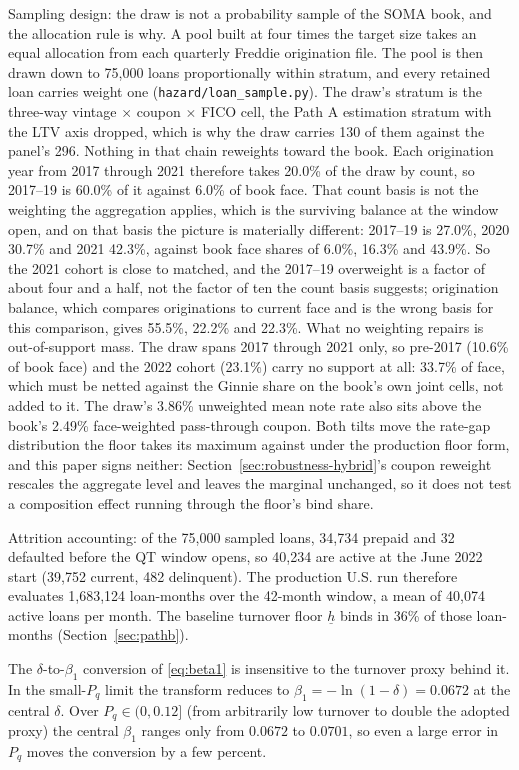 \documentclass[12pt]{article}
\begin{document}
Sampling design: the draw is not a probability sample of the SOMA book, and the allocation rule is why. A pool built at four times the target size takes an equal allocation from each quarterly Freddie origination file. The pool is then drawn down to 75,000 loans proportionally within stratum, and every retained loan carries weight one (\texttt{hazard/loan\_sample.py}). The draw's stratum is the three-way vintage $\times$ coupon $\times$ FICO cell, the Path A estimation stratum with the LTV axis dropped, which is why the draw carries 130 of them against the panel's 296. Nothing in that chain reweights toward the book. Each origination year from 2017 through 2021 therefore takes 20.0\% of the draw by count, so 2017--19 is 60.0\% of it against 6.0\% of book face. That count basis is not the weighting the aggregation applies, which is the surviving balance at the window open, and on that basis the picture is materially different: 2017--19 is 27.0\%, 2020 30.7\% and 2021 42.3\%, against book face shares of 6.0\%, 16.3\% and 43.9\%. So the 2021 cohort is close to matched, and the 2017--19 overweight is a factor of about four and a half, not the factor of ten the count basis suggests; origination balance, which compares originations to current face and is the wrong basis for this comparison, gives 55.5\%, 22.2\% and 22.3\%. What no weighting repairs is out-of-support mass. The draw spans 2017 through 2021 only, so pre-2017 (10.6\% of book face) and the 2022 cohort (23.1\%) carry no support at all: 33.7\% of face, which must be netted against the Ginnie share on the book's own joint cells, not added to it. The draw's 3.86\% unweighted mean note rate also sits above the book's 2.49\% face-weighted pass-through coupon. Both tilts move the rate-gap distribution the floor takes its maximum against under the production floor form, and this paper signs neither: Section~\ref{sec:robustness-hybrid}'s coupon reweight rescales the aggregate level and leaves the marginal unchanged, so it does not test a composition effect running through the floor's bind share.

Attrition accounting: of the 75,000 sampled loans, 34,734 prepaid and 32 defaulted before the QT window opens, so 40,234 are active at the June 2022 start (39,752 current, 482 delinquent). The production U.S. run therefore evaluates 1,683,124 loan-months over the 42-month window, a mean of 40,074 active loans per month. The baseline turnover floor $\underline{h}$ binds in 36\% of those loan-months (Section~\ref{sec:pathb}).

The $\delta$-to-$\beta_1$ conversion of \eqref{eq:beta1} is insensitive to the turnover proxy behind it. In the small-$P_q$ limit the transform reduces to $\beta_1 = -\ln(1-\delta) = 0.0672$ at the central $\delta$. Over $P_q \in (0, 0.12]$ (from arbitrarily low turnover to double the adopted proxy) the central $\beta_1$ ranges only from $0.0672$ to $0.0701$, so even a large error in $P_q$ moves the conversion by a few percent.
\end{document}
